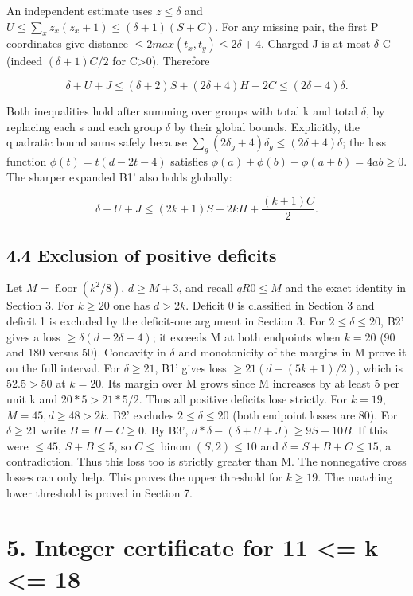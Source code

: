 \documentclass[
  11pt,
]{article}
\begin{document}
An independent estimate uses \(z\le \delta\) and
\(U\le\sum_x z_x(z_x+1)\le(\delta+1)(S+C)\). For any missing pair, the
first P coordinates give distance
\(\le 2max(t_{x},t_{y})\le 2\delta +4\). Charged J is at most \(\delta\)
C (indeed \((\delta+1)C/2\) for C\textgreater0). Therefore

\[\delta+U+J\le(\delta+2)S+(2\delta+4)H-2C\le(2\delta+4)\delta.\tag{B2'}\]

Both inequalities hold after summing over groups with total k and total
\(\delta\), by replacing each s and each group \(\delta\) by their
global bounds. Explicitly, the quadratic bound sums safely because
\(\sum_g(2\delta_g+4)\delta_g\le(2\delta+4)\delta\); the loss function
\(\phi (t)=t(d-2t-4)\) satisfies
\(\phi (a)+\phi (b)-\phi (a+b)=4ab\ge 0\). The sharper expanded B1' also
holds globally:

\[\delta+U+J\le(2k+1)S+2kH+\frac{(k+1)C}{2}.\tag{B3'}\]

\subsection{4.4 Exclusion of positive
deficits}\label{exclusion-of-positive-deficits}

Let \(M=\operatorname{floor}(k^2/8)\), \(d\ge M+3\), and recall
\(qR0\le M\) and the exact identity in Section 3. For \(k\ge 20\) one
has \(d>2k\). Deficit 0 is classified in Section 3 and deficit 1 is
excluded by the deficit-one argument in Section 3. For
\(2\le \delta \le 20\), B2' gives a loss \(\ge \delta (d-2\delta -4)\);
it exceeds M at both endpoints when \(k=20\) (90 and 180 versus 50).
Concavity in \(\delta\) and monotonicity of the margins in M prove it on
the full interval. For \(\delta \ge 21\), B1' gives loss
\(\ge 21(d-(5k+1)/2)\), which is \(52.5>50\) at \(k=20\). Its margin
over M grows since M increases by at least 5 per unit k and
\(20*5>21*5/2\). Thus all positive deficits lose strictly. For \(k=19\),
\(M=45,d\ge 48>2k\). B2' excludes \(2\le \delta \le 20\) (both endpoint
losses are 80). For \(\delta \ge 21\) write \(B=H-C\ge 0\). By B3',
\(d*\delta -(\delta +U+J)\ge 9S+10B\). If this were \(\le 45\),
\(S+B\le 5\), so \(C\le \operatorname{binom}(S,2)\le 10\) and
\(\delta =S+B+C\le 15\), a contradiction. Thus this loss too is strictly
greater than M. The nonnegative cross losses can only help. This proves
the upper threshold for \(k\ge 19\). The matching lower threshold is
proved in Section 7.

\section{5. Integer certificate for 11 \textless= k \textless=
18}\label{integer-certificate-for-11-k-18}
\end{document}
